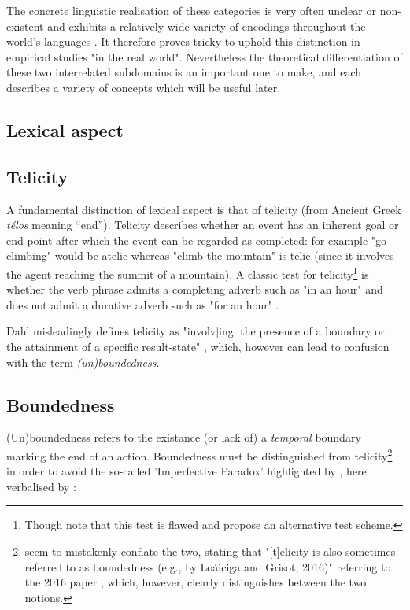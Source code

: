 The concrete linguistic realisation of these categories is very often unclear or non-existent and exhibits a relatively wide variety of encodings throughout the world’s languages \citep{Dahl1985TenseAA}. It therefore proves tricky to uphold this distinction in empirical studies "in the real world". Nevertheless the theoretical differentiation of these two interrelated subdomains is an important one to make, and each describes a variety of concepts which will be useful later.

\subsection{Lexical aspect}
\subsection*{Telicity}
A fundamental distinction of lexical aspect is that of telicity (from Ancient Greek \emph{télos} meaning “end”). Telicity describes whether an event has an inherent goal or end-point after which the event can be regarded as completed: for example "go climbing" would be atelic whereas "climb the mountain" is telic (since it involves the agent reaching the summit of a mountain). A classic test for telicity\footnote{Though \citet{XiaoMcenery+2006+1+21} note that this test is flawed and propose an alternative test scheme.} is whether the verb phrase admits a completing adverb such as "in an hour" and does not admit a durative adverb such as "for an hour" \citep{Krifka1998TheOO}.

Dahl misleadingly defines telicity as "involv[ing] the presence of a boundary or the attainment of a specific result-state" \citep{DAHL2015210}, which, however can lead to confusion with the term \emph{(un)boundedness}.
\subsection*{Boundedness}
(Un)boundedness refers to the existance (or lack of) a \emph{temporal} boundary marking the end of an action. Boundedness must be distinguished from telicity\footnote{\citet{friedrich-etal-2023-kind} seem to mistakenly conflate the two, stating that "[t]elicity is also sometimes referred to as boundedness (e.g., by Loáiciga and Grisot, 2016)" referring to the 2016 paper \citet{loaiciga-grisot-2016-predicting}, which, however, clearly distinguishes between the two notions.} in order to avoid the so-called 'Imperfective Paradox' highlighted by \citet{Linguistics2005DowtyD1}, here verbalised by \citet{zucchi}:

